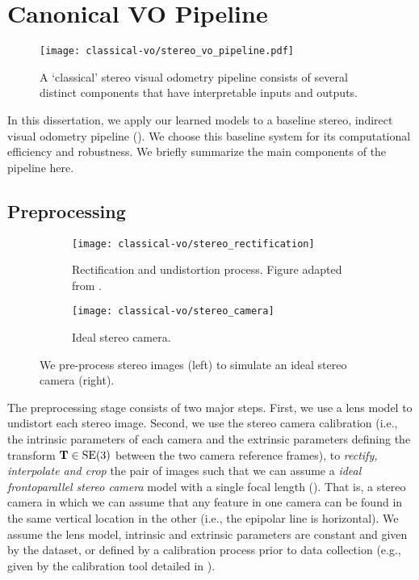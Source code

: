 \section{Canonical VO Pipeline}

\begin{figure}[h!]
\begin{center}
		\texttt{[image: classical-vo/stereo\_vo\_pipeline.pdf]}
		\caption{A `classical' stereo visual odometry pipeline consists of several distinct components that have interpretable inputs and outputs.}
  	\label{fig:vo_stereo_vo_pipeline}
\end{center}
\end{figure}

In this dissertation, we apply our learned models to a baseline stereo, indirect visual odometry pipeline (). We choose this baseline system for its computational efficiency and robustness. We briefly summarize the main components of the pipeline here.



\subsection{Preprocessing}


\begin{figure}[h!]
     \centering
     \begin{subfigure}[b]{0.48\textwidth}
         \centering
         \texttt{[image: classical-vo/stereo\_rectification]}
        \caption{Rectification and undistortion process. Figure adapted from \cite{florez2010}.}
         \label{fig:vo_undistort_recitfy}
	 \end{subfigure}
	 \begin{subfigure}[b]{0.48\textwidth}
         \centering
     		\texttt{[image: classical-vo/stereo\_camera]}
			\caption{Ideal stereo camera.}
			 \label{fig:vo_stereo_camera}
     \end{subfigure}
    \caption{We pre-process stereo images (left) to simulate an ideal stereo camera (right).}
        \label{fig:vo_preprocessing}
\end{figure}
The preprocessing stage consists of two major steps. First, we use a lens model to undistort each stereo image. Second, we use the stereo camera calibration (i.e., the intrinsic parameters of each camera and the extrinsic parameters defining the transform $\boldsymbol{\mathbf{T}} \in \mathrm{SE}(3)$ between the two camera reference frames), to \textit{rectify, interpolate and crop} the pair of images such that we can assume a \textit{ideal frontoparallel stereo camera} model with a single focal length (). That is, a stereo camera in which we can assume that any feature in one camera can be found in the same vertical location in the other (i.e., the epipolar line is horizontal). We assume the lens model, intrinsic and extrinsic parameters are constant and given by the dataset, or defined by a calibration process prior to data collection (e.g., given by the calibration tool detailed in \cite{Furgale2013-sl}).

